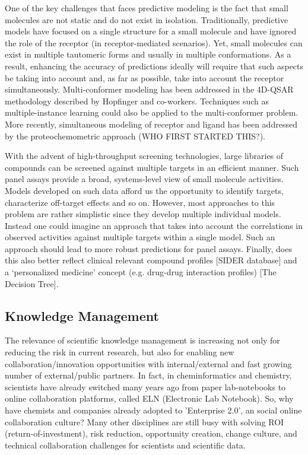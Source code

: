 \documentclass{sig-alternate}
\begin{document}
One of the key challenges that faces predictive modeling is the fact that small
molecules are not static and do not exist in isolation. Traditionally,
predictive models have focused on a single structure for a small molecule and
have ignored the role of the receptor (in receptor-mediated scenarios). Yet,
small molecules can exist in multiple tautomeric forms and usually in multiple
conformations. As a result, enhancing the accuracy of predictions ideally will
require that such aspects be taking into account and, as far as possible, take
into account the receptor simultaneously. Multi-conformer modeling has been
addressed in the 4D-QSAR methodology described by Hopfinger and co-workers.
Techniques such as multiple-instance learning could also be applied to the
multi-conformer problem. More recently, simultaneous modeling of receptor and
ligand has been addressed by the proteochemometric approach (WHO FIRST STARTED
THIS?).

With the advent of high-throughput screening technologies, large libraries of
compounds can be screened against multiple targets in an efficient manner. Such
panel assays provide a broad, systems-level view of small molecule activities.
Models developed on such data afford us the opportunity to identify targets,
characterize off-target effects and so on. However, most approaches to this
problem are rather simplistic since they develop multiple individual models.
Instead one could imagine an approach that takes into account the correlations
in observed activities against multiple targets within a single model. Such an
approach should lead to more robust predictions for panel assays. Finally, does
this also better reflect clinical relevant compound profiles [SIDER database]
and a ‘personalized medicine’ concept (e.g. drug-drug interaction profiles) [The
Decision Tree].

\subsection{Knowledge Management}
\label{sec:knowledge-management}

The relevance of scientific knowledge management is increasing not only for
reducing the risk in current research, but also for enabling new
collaboration/innovation opportunities with internal/external and fast growing
number of external/public partners. In fact, in cheminformatics and chemistry,
scientists have already switched many years ago from paper lab-notebooks to
online collaboration platforms, called ELN (Electronic Lab Notebook). So, why
have chemists and companies already adopted to 'Enterprise 2.0', an social
online collaboration culture? Many other disciplines are still busy with solving
ROI (return-of-investment), risk reduction, opportunity creation, change
culture, and technical collaboration challenges for scientists and scientific
data.
\end{document}
